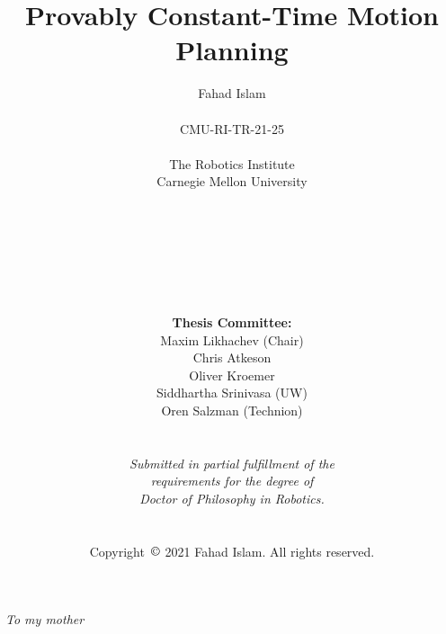 \documentclass[a4paper]{report}
\title{Provably Constant-Time Motion Planning}
\author{Fahad Islam\\
\\
CMU-RI-TR-21-25\\
\\
The Robotics Institute\\
Carnegie Mellon University\\
\\
\\
\\
\\
\\
\\
\\
\vspace{2mm}
\textbf{Thesis Committee:}\\
Maxim Likhachev (Chair)\\
Chris Atkeson\\
Oliver Kroemer\\
Siddhartha Srinivasa (UW)\\
Oren Salzman (Technion)\\
\\
\\
\textit{Submitted in partial fulfillment of the}\\
\textit{requirements for the degree of}\\
\textit{Doctor of Philosophy in Robotics.}\\
\\
\\
Copyright~$\copyright$ 2021 Fahad Islam. All rights reserved.
}
\begin{document}
\maketitle

%
%
%
%

\newpage
\begin{center}
\textit{To my mother}
\end{center}
\newpage
\end{document}
